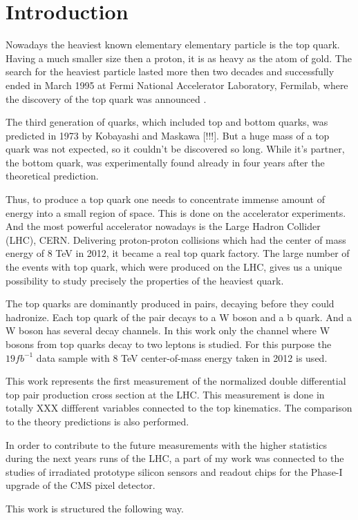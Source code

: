 \chapter{Introduction}

Nowadays the heaviest known elementary elementary particle is the top quark. 
Having a much smaller size then a proton, it is as heavy as the atom of gold. 
The search for the heaviest particle lasted more then two decades and successfully 
ended in March 1995 at Fermi National Accelerator Laboratory, Fermilab, where 
the discovery of the top quark was announced \cite{PhysRevLett.74.2626}. 

The third generation of quarks, which included top and bottom quarks, 
was predicted in 1973 by Kobayashi and Maskawa [!!!]. But a huge mass of a 
top quark was not expected, so it couldn't be discovered so long. While it's partner, 
the bottom quark, was experimentally found already in four years after the theoretical prediction. 

Thus, to produce a top quark one needs to concentrate immense amount of energy 
into a small region of space. This is done on the accelerator experiments. 
And the most powerful accelerator nowadays is the Large Hadron Collider (LHC), CERN. 
Delivering proton-proton collisions which had the center of mass energy of 8 TeV in 2012, 
it became a real top quark factory. The large number of the events with top quark, 
which were produced on the LHC, gives us a unique possibility to study precisely the properties of the heaviest quark. 

The top quarks are dominantly produced in pairs, decaying before they could hadronize. 
Each top quark of the pair decays to a W boson and a b quark. 
And a W boson has several decay channels. In this work only the channel 
where W bosons from top quarks decay to two leptons is studied. 
For this purpose the $19 fb^{-1}$ data sample with 8 TeV center-of-mass energy taken in 2012 is used.

This work represents the first measurement of the normalized double differential top pair production
cross section at the LHC. This measurement is done in totally XXX diffferent variables
connected to the top kinematics. The comparison to the theory predictions is also performed.

In order to contribute to the future measurements with the higher statistics during
the next years runs of the LHC, a part of my work was connected to the studies of irradiated
prototype silicon sensors and readout chips for the Phase-I upgrade of the CMS pixel detector.

This work is structured the following way.